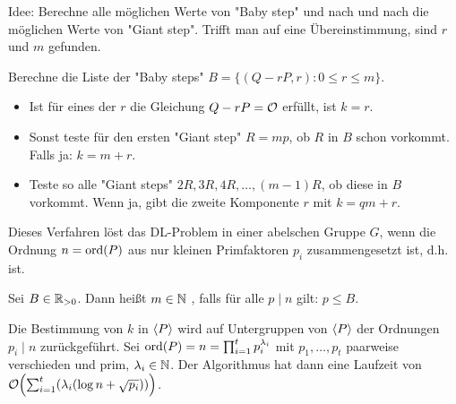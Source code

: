 \begin{bem}
	Idee: Berechne alle möglichen Werte von "Baby step" und nach und nach die möglichen Werte von "Giant step".
	Trifft man auf eine Übereinstimmung, sind $r$ und $m$ gefunden.
\end{bem}

\begin{anw}[Schritt 1]
	Berechne die Liste der "Baby steps" $B = \{(Q-rP,r) : 0 \leq r \leq m \}$.
\end{anw}

\begin{anw}[Schritt 2]
	\begin{itemize}
		\item Ist für eines der $r$ die Gleichung $Q - rP = \mathcal{O}$ erfüllt, ist $k = r$.
		\item Sonst teste für den ersten "Giant step" $R = mp$, ob $R$ in $B$ schon vorkommt.
		Falls ja: $k = m + r$.
		\item Teste so alle "Giant steps" $2R, 3R, 4R, \dots, (m-1)R$, ob diese in $B$ vorkommt.
		Wenn ja, gibt die zweite Komponente $r$ mit $k = qm+r$.
	\end{itemize}
\end{anw}

\begin{defn}
	Dieses Verfahren löst das DL-Problem in einer abelschen Gruppe $G$, wenn die Ordnung $n = \operatorname{ord}(P)$ aus nur kleinen Primfaktoren $p_i$ zusammengesetzt ist, d.h.  ist. 
\end{defn}

\begin{defn}[$B$-glatt]
	Sei $B \in \mathbb{R}_{>0}$.
	Dann heißt $m \in \mathbb{N}$ , falls für alle $p \mid n$ gilt: $p \leq B$.
\end{defn}

\begin{bem}
	Die Bestimmung von $k$ in $\langle P\rangle$ wird auf Untergruppen von $\langle P\rangle$ der Ordnungen $p_i \mid n$ zurückgeführt.
	Sei $\operatorname{ord}(P) = n = \prod_{i=1}^{t} p_i^{\lambda_i}$ mit $p_1, \dots, p_t$ paarweise verschieden und prim, $\lambda_i \in \mathbb{N}$.
	Der Algorithmus hat dann eine Laufzeit von $\oh \enb{\sum_{i=1}^{t} (\lambda_i(\log n + \sqrt{p_i}))}$.
\end{bem}

